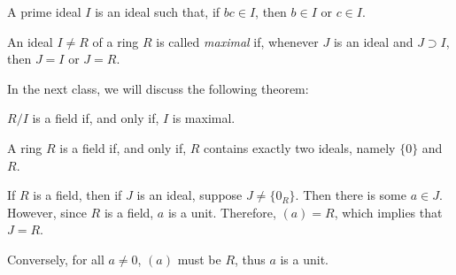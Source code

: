 \begin{defn}
	A prime ideal $I$ is an ideal such that, if $bc \in I$, then $b \in I$ or $c \in I$.
\end{defn}

\begin{defn}
	An ideal $I \neq R$ of a ring $R$ is called \emph{maximal} if, whenever $J$ is an ideal and $J \supset I$, then $J = I$ or $J = R$.
\end{defn}

In the next class, we will discuss the following theorem:
\begin{thm}
	$R / I$ is a field if, and only if,  $I$ is maximal.
\end{thm}

\begin{lem}\label{l22:fieldifftwoideals}
	A ring $R$ is a field if, and only if, $R$ contains exactly two ideals, namely $\{0\}$ and $R$.
\end{lem}
\begin{dem}
	If $R$ is a field, then if $J$ is an ideal, suppose $J \neq \{0_R\}$. Then there is some $a \in J$. However, since $R$ is a field, $a$ is a unit. Therefore, $(a) = R$, which implies that $J = R$.

	Conversely, for all $a \neq 0$, $(a)$ must be $R$, thus $a$ is a unit.
\end{dem}
